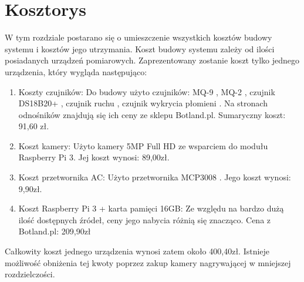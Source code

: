 \chapter{Kosztorys}

W tym rozdziale postarano się o umieszczenie wszystkich kosztów budowy systemu i kosztów jego utrzymania. Koszt budowy systemu zależy od ilości posiadanych urządzeń pomiarowych. Zaprezentowany zostanie koszt tylko jednego urządzenia, który wygląda następująco:
\begin{enumerate}
\item Koszty czujników:
Do budowy użyto czujników: MQ-9 \cite{specyfikacjaMQ-9}, MQ-2 \cite{specyfikacjaMQ-2}, czujnik DS18B20+ \cite{specyfikacjaTemp}, czujnik ruchu \cite{pir}, czujnik wykrycia płomieni \cite {specyfikacjaFlame}. Na stronach odnośników znajdują się ich ceny ze sklepu Botland.pl. Sumaryczny koszt: 91,60 zł.
\item Koszt kamery:
Użyto kamery 5MP Full HD ze wsparciem do modułu Raspberry Pi 3. Jej koszt wynosi: 89,00zł.
\item Koszt przetwornika AC:
Użyto przetwornika MCP3008 \cite{specyfikacjaAC}. Jego koszt wynosi: 9,90zł.
\item Koszt Raspberry Pi 3 + karta pamięci 16GB: 
Ze względu na bardzo dużą ilość dostępnych źródeł, ceny jego nabycia różnią się znacząco. Cena z Botland.pl: 209,90zł
\end{enumerate}
Całkowity koszt jednego urządzenia wynosi zatem około 400,40zł. Istnieje możliwość obniżenia tej kwoty poprzez zakup kamery nagrywającej w mniejszej rozdzielczości. 

